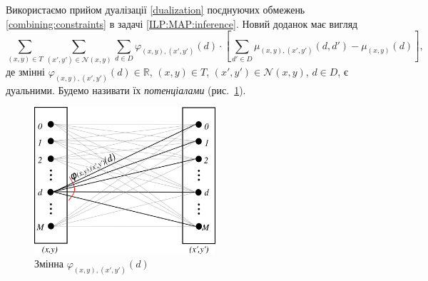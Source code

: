 Використаємо прийом дуалізації \eqref{dualization}
поєднуючих обмежень \eqref{combining:constraints}
в задачі \eqref{ILP:MAP:inference}.
Новий доданок має вигляд
\begin{equation} \label{dualized:term}
    \sum \limits_{\left(x, y \right) \in T}
        \sum \limits_{\left(x', y' \right) \in \mathcal{N} \left(x, y \right)}
            \sum \limits_{d \in D}
                \varphi_{\left(x, y \right), \left(x', y' \right)} \left(
                    d
                \right) \cdot \left[
                    \sum \limits_{d' \in D}
                        \mu_{\left(x, y \right), \left(x', y' \right)} \left(
                            d, d'
                        \right) - \mu_{\left(x, y \right)} \left(d \right)
                \right],
\end{equation}
де змінні
$\varphi_{\left(x, y \right), \left(x', y' \right)} \left( d \right) \in
    \mathbb{R}$,
$\left(x, y \right) \in T$,
$\left(x', y' \right) \in \mathcal{N} \left(x, y \right)$,
$d \in D$,
є дуальними.
Будемо називати їх \textit{потенціалами} (рис.~\ref{fig:phi:block}).

\begin{figure}[h]
  \centering
  \includegraphics[width=0.6\textwidth]{images/phi_block}
  \caption{Змінна $\varphi_{\left(x, y \right), \left(x', y' \right)} \left(d \right)$}
  \label{fig:phi:block}
\end{figure}

